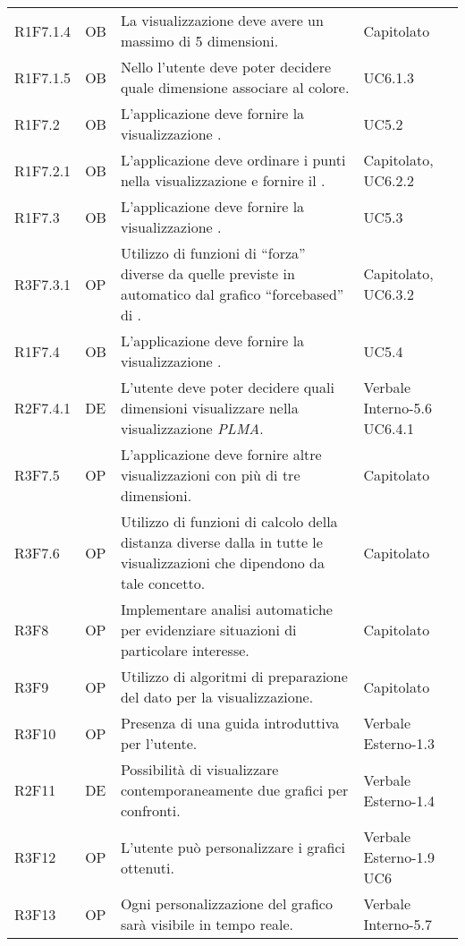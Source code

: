 {\begin{longtable}{C{2cm} | C{1.5cm} | C{9cm} | C{3.3cm}}
R1F7.1.4 & OB & La visualizzazione  deve avere un massimo di 5 dimensioni. & Capitolato\\

R1F7.1.5 & OB & Nello  l'utente deve poter decidere quale dimensione associare al colore. & UC6.1.3\\

R1F7.2 & OB & L'applicazione deve fornire la visualizzazione . & UC5.2\\
R1F7.2.1 & OB & L'applicazione deve ordinare i punti nella visualizzazione  e fornire il . & Capitolato, UC6.2.2 \\
R1F7.3 & OB & L'applicazione deve fornire la visualizzazione . & UC5.3\\
R3F7.3.1 & OP & Utilizzo di funzioni di “forza” diverse da quelle previste in automatico dal grafico “forcebased” di . & Capitolato, UC6.3.2\\
R1F7.4 & OB & L'applicazione deve fornire la visualizzazione . & UC5.4 \\
R2F7.4.1 & DE & L'utente deve poter decidere quali dimensioni visualizzare nella visualizzazione \textit{PLMA}. & Verbale Interno-5.6 \newline UC6.4.1\\
R3F7.5 & OP & L'applicazione deve fornire altre visualizzazioni con più di tre dimensioni. & Capitolato\\
R3F7.6 & OP & Utilizzo di funzioni di calcolo della distanza diverse dalla  in tutte le visualizzazioni che dipendono da tale concetto. & Capitolato \\
R3F8 & OP & Implementare analisi automatiche per evidenziare situazioni di particolare interesse. & Capitolato\\
R3F9 & OP & Utilizzo di algoritmi di preparazione del dato per la visualizzazione. & Capitolato\\
R3F10 & OP & Presenza di una guida introduttiva per l'utente. & Verbale Esterno-1.3\\
R2F11 & DE & Possibilità di visualizzare contemporaneamente due grafici per confronti. & Verbale Esterno-1.4\\
R3F12 & OP & L'utente può personalizzare i grafici ottenuti. & Verbale Esterno-1.9 \newline UC6 \\
R3F13 & OP & Ogni personalizzazione del grafico sarà visibile in tempo reale. & Verbale Interno-5.7 \\

\end{longtable}}
